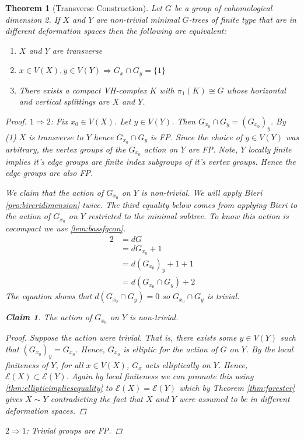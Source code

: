 \documentclass[12pt,parskip=full]{report}
\theoremstyle{plain}
\newtheorem{thm}{Theorem}[section]
\theoremstyle{definition}
\newtheorem*{claim*}{Claim}
\begin{document}
\begin{thm}
    [Transverse Construction]
    \label{pro:transverseconstruction} 
 Let \(G\) be a group of cohomological dimension 2. If \(X\) and \(Y\) are non-trivial minimal \(G\)-trees of finite type that are in different deformation spaces then the following are equivalent:
\begin{enumerate}
    \item $X$ and $Y$ are transverse
    \item $x \in V(X), y\in V(Y)\Longrightarrow G_x\cap G_y = \{1\}$
    \item There exists a compact VH-complex $K$ with $\pi_1(K) \cong G$ whose horizontal and vertical splittings are $X$ and $Y$.
\end{enumerate}
\begin{proof}

    $1\Rightarrow 2$: Fix $x_0 \in V(X)$. Let $y\in V(Y)$. Then $G_{x_0} \cap G_y = (G_{x_0})_y$. By (1) $X$ is transverse to $Y$ hence $G_{x_0}\cap G_y$ is FP. Since the choice of $y\in V(Y)$ was arbitrary, the vertex groups of the $G_{x_0}$ action on $Y$ are FP. Note, $Y$ locally finite implies it's edge groups are finite index subgroups of it's vertex groups. Hence the edge groups are also FP. 
    
    We claim that the action of $G_{x_0}$ on $Y$ is non-trivial. We will apply Bieri \ref{pro:bireridimension} twice. The third equality below comes from applying Bieri to the action of \(G_{x_0}\) on \(Y\) restricted to the minimal subtree. To know this action is cocompact we use \ref{lem:bassfgcon}.
    \begin{align*}
        2 &= dG\\
          &= dG_{x_0}+1\\
          &= d( G_{x_0} )_y+1+1\\
          &= d(G_{x_0}\cap G_y)+2
    \end{align*}
    The equation shows that $d(G_{x_0}\cap G_y)=0$ so $G_{x_0}\cap G_y$ is trivial.
    
    \begin{claim*}
    The action of $G_{x_0}$ on $Y$ is non-trivial.
    \begin{proof}
        Suppose the action were trivial. That is, there exists some $y\in V(Y)$ such that $(G_{x_0})_y=G_{x_0}$. Hence, $G_{x_0}$ is elliptic for the action of $G$ on $Y$. By the local finiteness of $Y$, for all $x\in V(X)$, $G_x$ acts elliptically on $Y$. Hence, $\mathcal{E}(X)\subset \mathcal{E}(Y)$. Again by local finiteness we can promote this using \ref{thm:ellipticimpliesequality} to $\mathcal{E}(X) = \mathcal{E}(Y)$ which by Theorem \ref{thm:forester} gives $X \sim Y$  contradicting the fact that $X$ and $Y$ were assumed to be in different deformation spaces.
    \end{proof}
    \end{claim*}
$2\Rightarrow 1$: Trivial groups are FP.


\end{proof}
\end{thm}
\end{document}
